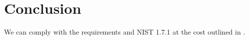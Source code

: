 \section{Conclusion}\label{sec:conc}
We can comply with the requirements and NIST 1.7.1 at the cost outlined in .
